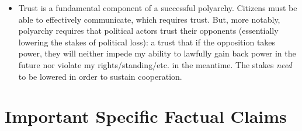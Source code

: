\documentclass[12pt]{article}
\begin{document}
\begin{itemize}[leftmargin=*, itemsep=4pt]
\begin{enumerate}
    \end{enumerate}
    \item Trust is a fundamental component of a successful polyarchy. Citizens must be able to effectively communicate, which requires trust. But, more notably, polyarchy requires that political actors trust their opponents (essentially lowering the stakes of political loss): a trust that if the opposition takes power, they will neither impede my ability to lawfully gain back power in the future nor violate my rights/standing/etc. in the meantime. The stakes \emph{need} to be lowered in order to sustain cooperation.
\end{itemize}


\section{Important Specific Factual Claims}
\end{document}
